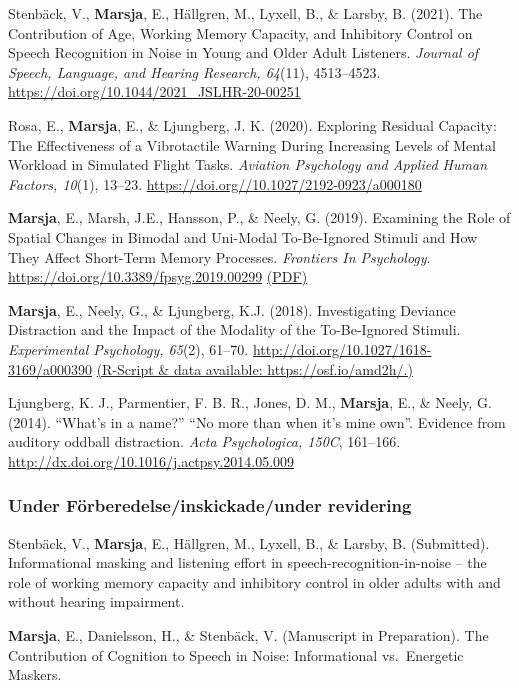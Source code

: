\documentclass[]{article}
\begin{document}
Stenbäck, V., \textbf{Marsja}, E., Hällgren, M., Lyxell, B., \& Larsby,
B. (2021). The Contribution of Age, Working Memory Capacity, and
Inhibitory Control on Speech Recognition in Noise in Young and Older
Adult Listeners. \emph{Journal of Speech, Language, and Hearing
Research, 64}(11), 4513--4523.
\url{https://doi.org/10.1044/2021_JSLHR-20-00251}

Rosa, E., \textbf{Marsja}, E., \& Ljungberg, J. K. (2020). Exploring
Residual Capacity: The Effectiveness of a Vibrotactile Warning During
Increasing Levels of Mental Workload in Simulated Flight Tasks.
\emph{Aviation Psychology and Applied Human Factors, 10}(1), 13--23.
\url{https://doi.org//10.1027/2192-0923/a000180}

\textbf{Marsja}, E., Marsh, J.E., Hansson, P., \& Neely, G. (2019).
Examining the Role of Spatial Changes in Bimodal and Uni-Modal
To-Be-Ignored Stimuli and How They Affect Short-Term Memory Processes.
\emph{Frontiers In Psychology}.
\url{https://doi.org/10.3389/fpsyg.2019.00299}
\href{https://bit.ly/3LkKD19}{(PDF)}

\textbf{Marsja}, E., Neely, G., \& Ljungberg, K.J. (2018). Investigating
Deviance Distraction and the Impact of the Modality of the To-Be-Ignored
Stimuli. \emph{Experimental Psychology, 65}(2), 61--70.
\url{http://doi.org/10.1027/1618-3169/a000390}
\href{https://osf.io/amd2h/.}{(R-Script \& data available:
https://osf.io/amd2h/.)}

Ljungberg, K. J., Parmentier, F. B. R., Jones, D. M., \textbf{Marsja},
E., \& Neely, G. (2014). ``What's in a name?'' ``No more than when it's
mine own''. Evidence from auditory oddball distraction. \emph{Acta
Psychologica, 150C}, 161--166.
\href{http://doi.org/10.1027/1618-3169/a000390}{http://dx.doi.org/10.1016/j.actpsy.2014.05.009}

\hypertarget{under-fuxf6rberedelseinskickadeunder-revidering}{%
\subsubsection{Under Förberedelse/inskickade/under
revidering}\label{under-fuxf6rberedelseinskickadeunder-revidering}}

Stenbäck, V., \textbf{Marsja}, E., Hällgren, M., Lyxell, B., \& Larsby,
B. (Submitted). Informational masking and listening effort in
speech-recognition-in-noise -- the role of working memory capacity and
inhibitory control in older adults with and without hearing impairment.

\textbf{Marsja}, E., Danielsson, H., \& Stenbäck, V. (Manuscript in
Preparation). The Contribution of Cognition to Speech in Noise:
Informational vs.~Energetic Maskers.
\end{document}
